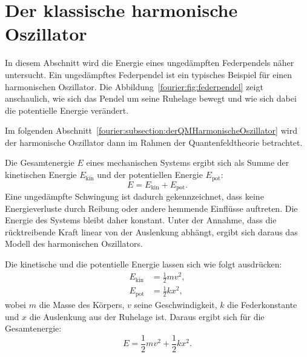 %
%
%
%

\section{Der klassische harmonische Oszillator\label{fourier:section:derKlassischeHarmonischeOszillator}}
%

In diesem Abschnitt wird die Energie eines ungedämpften Federpendels näher untersucht.
Ein ungedämpftes Federpendel ist ein typisches Beispiel für einen harmonischen Oszillator.
Die Abbildung~\ref{fourier:fig:federpendel} zeigt anschaulich, wie sich das Pendel um seine Ruhelage bewegt und wie sich dabei die potentielle Energie verändert.
%

Im folgenden Abschnitt~\ref{fourier:subsection:derQMHarmonischeOszillator} wird der harmonische Oszillator dann im Rahmen der Quantenfeldtheorie betrachtet.
%

Die Gesamtenergie \( E \) eines mechanischen Systems ergibt sich als Summe der kinetischen Energie \( E_{\text{kin}} \) und der potentiellen Energie \( E_{\text{pot}} \):  
\begin{equation}  
	E = E_{\text{kin}} + E_{\text{pot}}.  
\end{equation}
Eine ungedämpfte Schwingung ist dadurch gekennzeichnet, dass keine Energieverluste durch Reibung oder andere hemmende Einflüsse auftreten.  
Die Energie des Systems bleibt daher konstant.  
Unter der Annahme, dass die rücktreibende Kraft linear von der Auslenkung abhängt, ergibt sich daraus das Modell des harmonischen Oszillators.
%

Die kinetische und die potentielle Energie lassen sich wie folgt ausdrücken:  
\begin{align}  
	E_{\text{kin}} &= \frac{1}{2} m v^2, \\  
	E_{\text{pot}} &= \frac{1}{2} k x^2,  
\end{align}  
wobei \( m \) die Masse des Körpers, \( v \) seine Geschwindigkeit, \( k \) die Federkonstante und \( x \) die Auslenkung aus der Ruhelage ist.
%
Daraus ergibt sich für die Gesamtenergie:  
\begin{equation}  
	E = \frac{1}{2} m v^2 + \frac{1}{2} k x^2.  
\end{equation}

